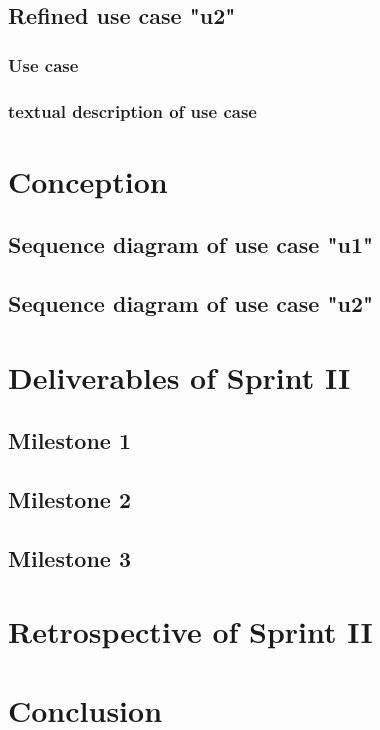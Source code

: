 \subsection{Refined use case "u2"}
\subsubsection{Use case}
\subsubsection{textual description of use case}

\section{Conception}
\subsection{Sequence diagram of use case "u1"}
\subsection{Sequence diagram of use case "u2"}

\section{Deliverables of Sprint II}
\subsection{Milestone 1}
\subsection{Milestone 2}
\subsection{Milestone 3}
\section{Retrospective of Sprint II}
\section{Conclusion}
